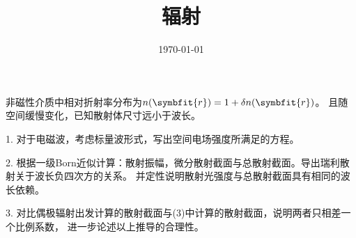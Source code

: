 \documentclass[11pt,a4paper]{ctexart}
\title{辐射}
\author{}
\date{\today}
\begin{document}
\maketitle

{
    \kaishu
    非磁性介质中相对折射率分布为$n(\symbfit{r}) = 1 + \delta n(\symbfit{r})$。
    且随空间缓慢变化，已知散射体尺寸远小于波长。

    1. 对于电磁波，考虑标量波形式，写出空间电场强度所满足的方程。

    2. 根据一级Born近似计算：散射振幅，微分散射截面与总散射截面。导出瑞利散射关于波长负四次方的关系。
    并定性说明散射光强度与总散射截面具有相同的波长依赖。

    3. 对比偶极辐射出发计算的散射截面与(3)中计算的散射截面，说明两者只相差一个比例系数，
    进一步论述以上推导的合理性。
}

\bigskip
\end{document}
